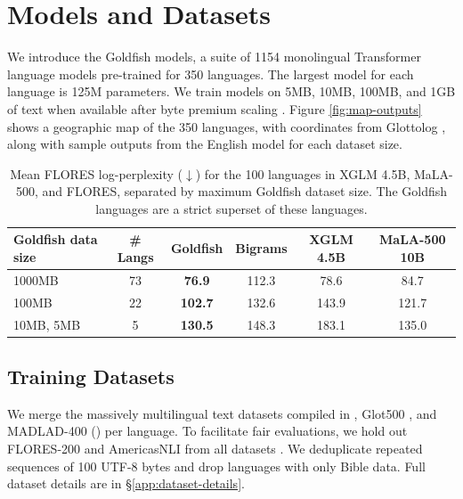 \documentclass[11pt]{article}
\begin{document}
\section{Models and Datasets}
We introduce the Goldfish models, a suite of 1154 monolingual Transformer language models pre-trained for 350 languages. The largest model for each language is 125M parameters.
We train models on 5MB, 10MB, 100MB, and 1GB of text when available after byte premium scaling \citep{arnett2024bit}.
Figure \ref{fig:map-outputs} shows a geographic map of the 350 languages, with coordinates from Glottolog \citep{hammarstrom-etal-2021-glottolog}, along with sample outputs from the English model for each dataset size.

\setlength{\belowcaptionskip}{-0.35cm}
\begin{table}[t]
    \centering
    \footnotesize
    \renewcommand{\arraystretch}{1.3}
    \begin{tabular}{|p{2.4cm}|c|cccc|}
        \cline{1-6}
        Goldfish data size &
        \multicolumn{1}{c|}{\# Langs} &
        \multicolumn{1}{c|}{Goldfish} &
        \multicolumn{1}{c|}{Bigrams} &
        \multicolumn{1}{c|}{XGLM 4.5B} &
        \multicolumn{1}{c|}{MaLA-500 10B} \\ 
        \hline
        1000MB & 73 & \textbf{76.9} & 112.3 & 78.6 & 84.7 \\
        100MB & 22 & \textbf{102.7} & 132.6 & 143.9 & 121.7 \\
        10MB, 5MB & 5 & \textbf{130.5} & 148.3 & 183.1 & 135.0 \\
        \hline
    \end{tabular}
    \normalsize
    \caption{Mean FLORES log-perplexity ($\downarrow$) for the 100 languages in XGLM 4.5B, MaLA-500, and FLORES, separated by maximum Goldfish dataset size. The Goldfish languages are a strict superset of these languages.
    }
    \label{tab:mean-ppls}
\end{table}
\setlength{\belowcaptionskip}{0cm}

\subsection{Training Datasets}
\label{sec:datasets}
We merge the massively multilingual text datasets compiled in \citet{chang-etal-2023-multilinguality}, Glot500 \citep{imanigooghari-etal-2023-glot500}, and MADLAD-400 (\citealp{kudugunta-etal-2023-madlad400}) per language.
To facilitate fair evaluations, we hold out FLORES-200 and AmericasNLI from all datasets \citep{costa2022no,ebrahimi2021americasnli}.
We deduplicate repeated sequences of 100 UTF-8 bytes and drop languages with only Bible data.
Full dataset details are in \S\ref{app:dataset-details}.
\end{document}
